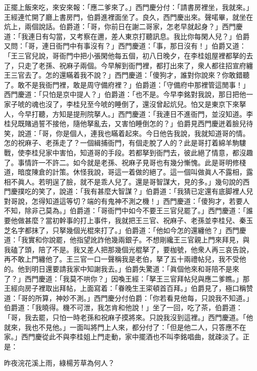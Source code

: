 正擺上飯來吃，來安來報：「應二爹來了。」西門慶分付：「請書房裡坐，我就來。」王經連忙開了廳上書房門，伯爵進裡面坐了。良久，西門慶出來。聲喏畢，就坐在炕上，兩個說話。伯爵道：「哥，你前日在謝二哥家，怎老早就起身？」西門慶道：「我連日有勾當，又考察在邇，差人東京打聽訊息。我比你每閑人兒？」伯爵又問：「哥，連日衙門中有事沒有？」西門慶道：「事，那日沒有！」伯爵又道：「王三官兒說，哥衙門中把小張閑他每五個，初八日晚夕，在李桂姐屋裡都拏的去了，只走了老孫、祝麻子兩個。今早解到衙門裡，都打出來了，衆人都往招宣府纏王三官去了。怎的還瞞着我不說？」西門慶道：「傻狗才，誰對你說來？你敢錯聽了。敢不是我衙門裡，敢是周守備府裡？」{}伯爵道：「守備府中那裡管這閒事！」西門慶道：「只怕是京中提人？」伯爵道：「也不是。今早李銘對我說，那日把他一家子唬的魂也沒了，李桂兒至今唬的睡倒了，還沒曾起炕兒。怕又是東京下來拏人，今早打聽，方知是提刑院拏人。」西門慶道：「我連日不進衙門，並沒知道。李桂兒既賭過誓不接他，隨他拏亂去，又害怕睡倒怎的？」伯爵見西門慶迸着臉兒待笑，說道：「哥，你是個人，連我也瞞着起來。今日他告我說，我就知道哥的情。怎的祝麻子、老孫走了？一個緝捕衙門，有個走脫了人的？此是哥打着綿羊駒䮫戰，使李桂兒家中害怕，知道哥的手段。若都拏到衙門去，彼此絕了情意，都沒趣了。事情許一不許二。如今就是老孫、祝麻子見哥也有幾分慚愧。此是哥明修棧道，暗度陳倉的計策。休怪我說，哥這一着做的絕了。這一個叫做眞人不露相，露相不眞人。若明逞了臉，就不是乖人兒了。還是哥智謀大，見的多。」{}幾句說的西門慶撲吃的笑了，說道：「我有甚麼大智謀？」伯爵道：「我猜已定還有底脚裡人兒對哥說，怎得知道這等切？端的有鬼神不測之機！」西門慶道：「傻狗才，若要人不知，除非己莫為。」伯爵道：「哥衙門中如今不要王三官兒罷了。」西門慶道：「誰要他做甚麼？當初幹事的打上事件，我就把王三官、祝麻子、老孫並李桂兒、秦玉芝名字都抹了，只拏幾個光棍來打了。」伯爵道：「他如今怎的還纏他？」西門慶道：「我實和你說罷，他指望訛詐他幾兩銀子。不想剛纔王三官親上門來拜見，與我磕了頭，陪了不是。我又差人把那幾個光棍拏了，要枷號，他衆人再三哀告說，再不敢上門纏他了。王三官一口一聲稱我是老伯，{}拏了五十兩禮帖兒，我不受他的。他到明日還要請我家中知謝我去。」伯爵失驚道：「眞個他來和哥陪不是來了？」西門慶道：「我莫不哄你？」因喚王經：「拏王三官拜帖兒與應二爹瞧。」那王經向房子裡取出拜帖，上面寫着：「眷晚生王寀頓首百拜。」伯爵見了，極口稱赞道：「哥的所算，神妙不測。」西門慶分付伯爵：「你若看見他每，只說我不知道。」伯爵道：「我曉得。機不可泄，我怎肯和他說！」坐了一回，吃了茶，伯爵道：「哥，我去罷，只怕一時老孫和祝麻子摸將來。只說我沒到這裡。」西門慶道。「他就來，我也不見他。」{}一面叫將門上人來，都分付了：「但是他二人，只答應不在家。」西門慶從此不與李桂姐上門走動，家中擺酒也不叫李銘唱曲，就疎淡了。正是：

\begin{myquote} 
昨夜浣花溪上雨，綠楊芳草為何人？
\end{myquote} 

